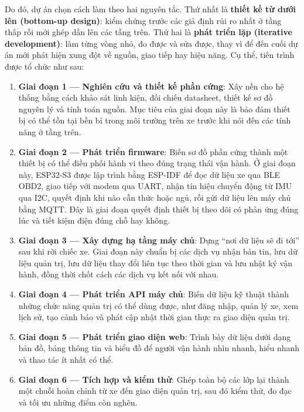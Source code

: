 \documentclass[a4paper]{extarticle}
\providecommand{\tightlist}{%
  \setlength{\itemsep}{0pt}\setlength{\parskip}{0pt}}
\begin{document}
Do đó, dự án chọn cách làm theo hai nguyên tắc. Thứ nhất là \textbf{thiết
kế từ dưới lên (bottom-up design)}: kiểm chứng trước các giả định rủi ro
nhất ở tầng thấp rồi mới ghép dần lên các tầng trên. Thứ hai là
\textbf{phát triển lặp (iterative development)}: làm từng vòng nhỏ, đo
được và sửa được, thay vì để đến cuối dự án mới phát hiện xung đột về
nguồn, giao tiếp hay hiệu năng. Cụ thể, tiến trình được tổ chức như sau:

\begin{enumerate}
\def\labelenumi{\arabic{enumi}.}
\tightlist
\item
  \textbf{Giai đoạn 1 --- Nghiên cứu và thiết kế phần cứng}: Xây nền cho
  hệ thống bằng cách khảo sát linh kiện, đối chiếu datasheet, thiết kế
  sơ đồ nguyên lý và tính toán nguồn. Mục tiêu của giai đoạn này là bảo
  đảm thiết bị có thể tồn tại bền bỉ trong môi trường trên xe trước khi
  nói đến các tính năng ở tầng trên.
\item
  \textbf{Giai đoạn 2 --- Phát triển firmware}: Biến sơ đồ phần cứng
  thành một thiết bị có thể điều phối hành vi theo đúng trạng thái vận
  hành. Ở giai đoạn này, ESP32-S3 được lập trình bằng ESP-IDF để đọc dữ
  liệu xe qua BLE OBD2, giao tiếp với modem qua UART, nhận tín hiệu
  chuyển động từ IMU qua I2C, quyết định khi nào cần thức hoặc ngủ, rồi
  gửi dữ liệu lên máy chủ bằng MQTT. Đây là giai đoạn quyết định thiết
  bị theo dõi có phản ứng đúng lúc và tiết kiệm điện đúng chỗ hay không.
\item
  \textbf{Giai đoạn 3 --- Xây dựng hạ tầng máy chủ}: Dựng ``nơi dữ liệu
  sẽ đi tới'' sau khi rời chiếc xe. Giai đoạn này chuẩn bị các dịch vụ
  nhận bản tin, lưu dữ liệu quản trị, lưu dữ liệu thay đổi liên tục theo
  thời gian và lưu nhật ký vận hành, đồng thời chốt cách các dịch vụ kết
  nối với nhau.
\item
  \textbf{Giai đoạn 4 --- Phát triển API máy chủ}: Biến dữ liệu kỹ thuật
  thành những chức năng quản trị có thể dùng được, như đăng nhập, quản
  lý xe, xem lịch sử, tạo cảnh báo và phát cập nhật thời gian thực ra
  giao diện quản trị.
\item
  \textbf{Giai đoạn 5 --- Phát triển giao diện web}: Trình bày dữ liệu dưới
  dạng bản đồ, bảng thông tin và biểu đồ để người vận hành nhìn nhanh,
  hiểu nhanh và thao tác ít nhất có thể.
\item
  \textbf{Giai đoạn 6 --- Tích hợp và kiểm thử}: Ghép toàn bộ các lớp
  lại thành một chuỗi hoàn chỉnh từ xe đến giao diện quản trị, sau đó kiểm thử,
  đo đạc và tối ưu những điểm còn nghẽn.
\end{enumerate}
\end{document}
